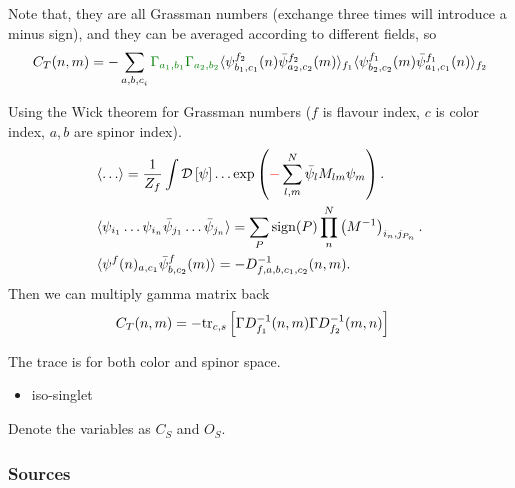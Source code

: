 Note that, they are all Grassman numbers (exchange three times will introduce a minus sign), and they can be averaged according to different fields, so
\begin{equation}
\begin{split}
&C_T(n,m)=-\sum _{{a,b,c}_i}\textcolor[rgb]{0,0.5,0}{\Gamma _{a_1,b_1}}\textcolor[rgb]{0,0.5,0}{\Gamma _{a_2,b_2}}\langle \psi ^{f_2} _{b_1,c_1} (n)\bar{\psi} ^{f_2} _{a_2,c_2}(m)\rangle _{f_1}\langle \psi ^{f_1}_{b_2,c_2}(m)\bar{\psi} ^{f_1} _{a_1,c_1} (n)\rangle _{f_2}\\
\end{split}
\end{equation}

Using the Wick theorem for Grassman numbers ($f$ is flavour index, $c$ is color index, $a,b$ are spinor index).
\begin{equation}
\begin{split}
&\langle \ldots \rangle = \frac{1}{Z_f}\int \mathcal{D}\left[\psi\right]\ldots \exp \left(\textcolor[rgb]{1,0,0}{-}\sum _{l,m}^N\bar{\psi}_lM_{lm}\psi_m\right).\\
&\langle \psi _{i_1}\ldots \psi _{i_n} \bar{\psi}_{j_1}\ldots \bar{\psi}_{j_n}\rangle = \sum _{P}{\rm sign}(P)\prod ^N_n \left(M^{-1}\right)_{i_n,j_{P_n}}.\\
&\langle \psi^f (n)_{a,c_1}\bar{\psi}^f_{b,c_2}(m)\rangle = -D_{f,a,b,c_1,c_2}^{-1}(n,m).\\
\end{split}
\label{eq.WickTherom}
\end{equation}
Then we can multiply gamma matrix back
\begin{equation}
\begin{split}
&C_T(n,m)=-{\rm tr}_{c,s} \left[\Gamma D^{-1}_{f_1}(n,m)\Gamma D^{-1}_{f_2}(m,n)\right]
\end{split}
\end{equation}

The trace is for both color and spinor space.

\begin{itemize}
  \item iso-singlet
\end{itemize}

Denote the variables as $C_S$ and $O_S$.

\subsubsection{\label{Source}Sources}

